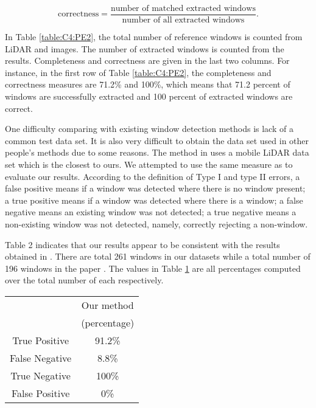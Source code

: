 \[
 \text{correctness} = \frac{\text{number of matched extracted windows}}{\text{number of all extracted windows}}.
\]

In Table \ref{table:C4:PE2}, the total number of reference windows is counted from LiDAR and images. The number of extracted windows is counted from the results. Completeness and correctness are given in the last two columns. For instance, in the first row of Table  \ref{table:C4:PE2}, the completeness and correctness measures are 71.2\% and 100\%, which means that 71.2 percent of windows are successfully extracted and 100 percent of extracted windows are correct. 

One difficulty comparing with existing window detection methods is lack of a common test data set. It is also very difficult to obtain the data set used in other people's methods due to some reasons. The method in \cite{Ali08} uses a mobile LiDAR data set which is the closest to ours. We attempted to use the same measure as \cite{Ali08} to evaluate our results. According to the definition of 
Type I and type II errors, a false positive means if a window was detected where there is no window present; a true positive means if a window was detected where there is a window; a false negative means an existing window was not detected; a true negative means a non-existing window was not detected, namely, correctly rejecting a
non-window.



Table 2 indicates that our results appear to be consistent
with the results obtained in \cite{Ali08}. There are total 261 windows in our datasets while a total number of 196 windows in the paper \cite{Ali08}. The values in Table \ref{table:C4:PE3} are all percentages computed over the total number of each respectively.  

\begin{table}
\centering
{}
\begin{tabular}{|c|c|}
\hline
 & Our method   \\
& (percentage)  \\
\hline
True Positive &  91.2\% \\
\hline
False Negative  &  8.8\% \\
\hline
True Negative  &  100\% \\
\hline
False Positive  &  0\% \\
\hline

\end{tabular}
\label{table:C4:PE3}
\end{table}

